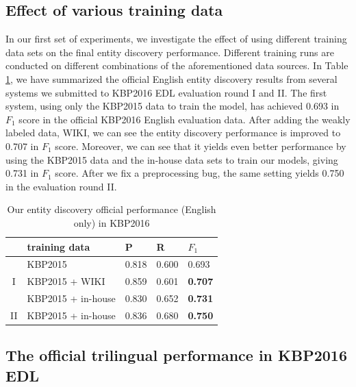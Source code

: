 \documentclass[11pt,a4paper]{article}
\begin{document}
\subsection{Effect of various training data}

In our first set of experiments, we investigate the effect of using different training data sets on the final entity discovery performance. 
Different training runs are conducted on different combinations of the aforementioned data sources.
In Table \ref{tbl:kbp2016-EDL1}, we have summarized the official English entity discovery results from several systems we submitted to KBP2016 EDL evaluation round I and II. The first system, using only the KBP2015 data to train the model, has achieved 0.693 in $F_1$ score in the official KBP2016 English evaluation data. After adding the weakly labeled data, WIKI, we can see the entity discovery performance is improved to 0.707 in  $F_1$ score. Moreover, we can see that it yields even better performance by using the KBP2015 data and the in-house data sets to train our models, giving 0.731 in $F_1$ score. After we fix a preprocessing bug, the same setting yields 0.750 in the evaluation round II. 

\begin{table}[h]
	\centering
	\begin{tabular}{|c|l|ll|l|}
		\hline
		 & training data  &  P   &  R  &  $F_1$ \\ \hline \hline
		 & KBP2015 &  0.818 & 0.600 & 0.693 \\
		I  & KBP2015 + WIKI  &   0.859 & 0.601 & \bf 0.707 \\
		  & KBP2015 + in-house & 0.830 & 0.652 & \bf 0.731 \\ \hline
		II & KBP2015 + in-house & 0.836 & 0.680 & \bf 0.750 \\ 
		\hline
	\end{tabular}
	\caption{Our entity discovery official performance (English only) in KBP2016 
	}
	\label{tbl:kbp2016-EDL1}	
\end{table}


\subsection{The official trilingual performance in KBP2016 EDL}
\end{document}
